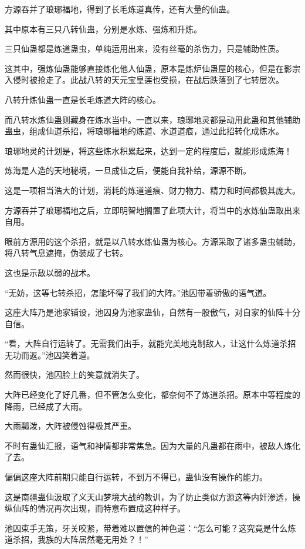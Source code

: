 \begin{this_body}
方源吞并了琅琊福地，得到了长毛炼道真传，还有大量的仙蛊。

其中原本有三只八转仙蛊，分别是水炼、强炼和升炼。

三只仙蛊都是炼道蛊虫，单纯运用出来，没有丝毫的杀伤力，只是辅助性质。

这其中，强炼仙蛊能够直接炼化他人仙蛊，原本是炼炉仙蛊屋的核心，但是在影宗入侵时被抢走了。此战八转的天元宝皇莲也受损，在战后跌落到了七转层次。

八转升炼仙蛊一直是长毛炼道大阵的核心。

而八转水炼仙蛊则藏身在炼水当中。一直以来，琅琊地灵都是动用此蛊和其他辅助蛊虫，组成仙道杀招，将琅琊福地的炼道、水道道痕，通过此招转化成炼水。

琅琊地灵的计划是，将这些炼水积累起来，达到一定的程度后，就能形成炼海！

炼海是人造的天地秘境，一旦成仙之后，便能自我补给，源源不断。

这是一项相当浩大的计划，消耗的炼道道痕、财力物力、精力和时间都极其庞大。

方源吞并了琅琊福地之后，立即明智地搁置了此项大计，将当中的水炼仙蛊取出来自用。

眼前方源用的这个杀招，就是以八转水炼仙蛊为核心。方源采取了诸多蛊虫辅助，将八转气息遮掩，伪装成了七转。

这也是示敌以弱的战术。

“无妨，这等七转杀招，怎能坏得了我们的大阵。”池囚带着骄傲的语气道。

这座大阵乃是池家铺设，池囚身为池家蛊仙，自然有一股傲气，对自家的仙阵十分自信。

“看，大阵自行运转了。无需我们出手，就能完美地克制敌人，让这什么炼道杀招无功而返。”池囚笑着道。

然而很快，池囚脸上的笑意就消失了。

大阵已经变化了好几番，但不管怎么变化，都奈何不了炼道杀招。原本中等程度的降雨，已经成了大雨。

大雨瓢泼，大阵被侵蚀得极其严重。

不时有蛊仙汇报，语气和神情都非常焦急。因为大量的凡蛊都在雨中，被敌人炼化了去。

偏偏这座大阵前期只能自行运转，不到万不得已，蛊仙没有操作的能力。

这是南疆蛊仙汲取了义天山梦境大战的教训，为了防止类似方源这等内奸渗透，操纵仙阵的情况再次出现，而特意布置成这种样子。

池囚束手无策，牙关咬紧，带着难以置信的神色道：“怎么可能？这究竟是什么炼道杀招，我族的大阵居然毫无用处？！”


\end{this_body}

